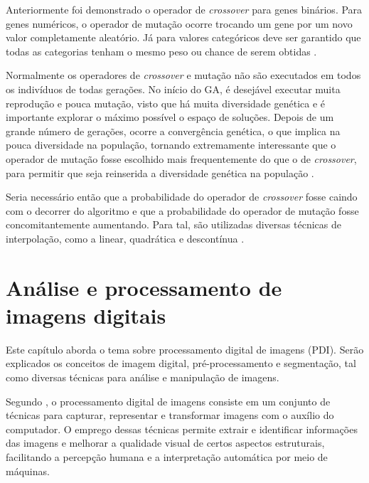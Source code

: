 \documentclass[12pt,oneside,a4paper,english,french,spanish,brazil,]{abntex2}
\begin{document}
Anteriormente foi demonstrado o operador de \textit{crossover} para genes binários. Para genes numéricos, o operador de mutação ocorre trocando um gene por um novo valor completamente aleatório. Já para valores categóricos deve ser garantido que todas as categorias tenham o mesmo peso ou chance de serem obtidas \cite{linden:2008}.

Normalmente os operadores de \textit{crossover} e mutação não são executados em todos os indivíduos de todas gerações. No início do GA, é desejável executar muita reprodução e pouca mutação, visto que há muita diversidade genética e é importante explorar o máximo possível o espaço de soluções. Depois de um grande número de gerações, ocorre a convergência genética, o que implica na pouca diversidade na população, tornando extremamente interessante que o operador de mutação fosse escolhido mais frequentemente do que o de \textit{crossover}, para permitir que seja reinserida a diversidade genética na população \cite{linden:2008}.

Seria necessário então que a probabilidade do operador de \textit{crossover} fosse caindo com o decorrer do algoritmo e que a probabilidade do operador de mutação fosse concomitantemente aumentando. Para tal, são utilizadas diversas técnicas de interpolação, como a linear, quadrática e descontínua \cite{linden:2008}.

\chapter{Análise e processamento de imagens digitais}

Este capítulo aborda o tema sobre processamento digital de imagens (PDI). Serão explicados os conceitos de imagem digital, pré-processamento e segmentação, tal como diversas técnicas para análise e manipulação de imagens.

Segundo \citet{pedrini:2008}, o processamento digital de imagens consiste em um conjunto de técnicas para capturar, representar e transformar imagens com o auxílio do computador. O emprego dessas técnicas permite extrair e identificar informações das imagens e melhorar a qualidade visual de certos aspectos estruturais, facilitando a percepção humana e a interpretação automática por meio de máquinas. 
\end{document}

